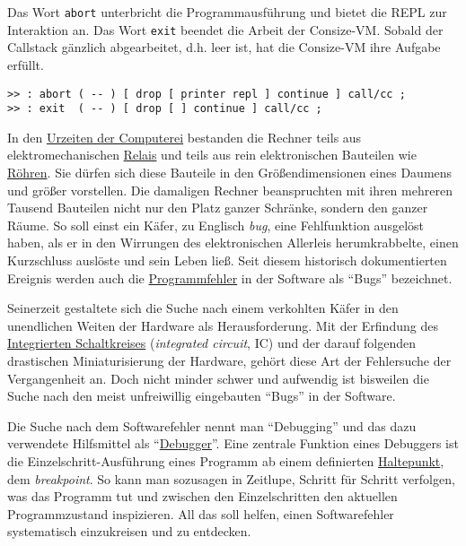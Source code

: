 Das Wort \verb|abort| unterbricht die Programmausführung und bietet die REPL zur Interaktion an. Das Wort \verb|exit| beendet die Arbeit der Consize-VM. Sobald der Callstack gänzlich abgearbeitet, d.h. leer ist, hat die Consize-VM ihre Aufgabe erfüllt. 

\begin{verbatim}
>> : abort ( -- ) [ drop [ printer repl ] continue ] call/cc ;
>> : exit  ( -- ) [ drop [ ] continue ] call/cc ;
\end{verbatim}

In den \href{http://de.wikipedia.org/wiki/Computer#Entwicklung\_des\_modernen\_turingm.C3.A4chtigen\_Computers}{Urzeiten der Computerei} bestanden die Rechner teils aus elektromechanischen \href{http://de.wikipedia.org/wiki/Relais}{Relais} und teils aus rein elektronischen Bauteilen wie \href{http://de.wikipedia.org/wiki/Elektronenr\%C3\%B6hre}{Röhren}. Sie dürfen sich diese Bauteile in den Größendimensionen eines Daumens und größer vorstellen. Die damaligen Rechner beanspruchten mit ihren mehreren Tausend Bauteilen nicht nur den Platz ganzer Schränke, sondern den ganzer Räume. So soll einst ein Käfer, zu Englisch \emph{bug}, eine Fehlfunktion ausgelöst haben, als er in den Wirrungen des elektronischen Allerleis herumkrabbelte, einen Kurzschluss auslöste und sein Leben ließ. Seit diesem historisch dokumentierten Ereignis werden auch die \href{http://de.wikipedia.org/wiki/Programmfehler}{Programmfehler} in der Software als "`Bugs"' bezeichnet.

Seinerzeit gestaltete sich die Suche nach einem verkohlten Käfer in den unendlichen Weiten der Hardware als Herausforderung. Mit der Erfindung des \href{http://de.wikipedia.org/wiki/Integrierter\_Schaltkreis}{Integrierten Schaltkreises} (\emph{integrated circuit}, IC) und der darauf folgenden drastischen Miniaturisierung der Hardware, gehört diese Art der Fehlersuche der Vergangenheit an. Doch nicht minder schwer und aufwendig ist bisweilen die Suche nach den meist unfreiwillig eingebauten "`Bugs"' in der Software.

Die Suche nach dem Softwarefehler nennt man "`Debugging"' und das dazu verwendete Hilfsmittel als "`\href{http://de.wikipedia.org/wiki/Debugger}{Debugger}"'. Eine zentrale Funktion eines Debuggers ist die Einzelschritt-Ausführung eines Programm ab einem definierten \href{http://de.wikipedia.org/wiki/Debugger#Haltepunkte}{Haltepunkt}, dem \emph{breakpoint}. So kann man sozusagen in Zeitlupe, Schritt für Schritt verfolgen, was das Programm tut und zwischen den Einzelschritten den aktuellen Programmzustand inspizieren. All das soll helfen, einen Softwarefehler systematisch einzukreisen und zu entdecken. 

